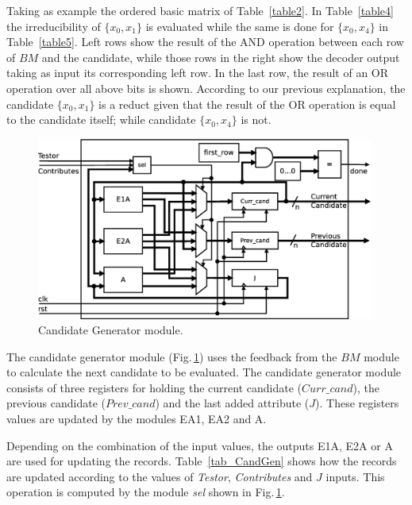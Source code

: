 \documentclass[authoryear,preprint,review,12pt]{elsarticle}
\begin{document}
Taking as example the ordered basic matrix of Table~\ref{table2}. In Table~\ref{table4} the irreducibility of  $\{x_0,x_1\}$ is evaluated while the same is done for $\{x_0,x_4\}$ in Table~\ref{table5}. Left rows show the result of the AND operation between each row of $BM$ and the candidate, while those rows in the right show the decoder output taking as input its corresponding left row. In the last row, the result of an OR operation over all above bits is shown. According to our previous explanation, the candidate $\{x_0,x_1\}$ is a reduct given that the result of the OR operation is equal to the candidate itself; while candidate $\{x_0,x_4\}$ is not.

\begin{figure}[t]
    \begin{center}
        \includegraphics[height=6cm]{CandGen.eps}
    \end{center}
\caption{Candidate Generator module.}
\label{fig:5}
\end{figure}

The candidate generator module (Fig.\,\ref{fig:5}) uses the feedback from the $BM$ module
to calculate the next candidate to be evaluated. The
candidate generator module consists of three
registers for holding the current candidate (\textit{$Curr\_cand$}), the previous candidate
(\textit{$Prev\_cand$}) and the last added attribute ($J$). These registers values are updated
by the modules EA1, EA2 and A.

Depending on the combination of the input values, the outputs E1A,
E2A or A are used for updating the records. Table~\ref{tab_CandGen} shows how the records are updated 
according to the values of \textit{Testor}, \textit{Contributes} and $J$ inputs. 
This operation is computed by the module \textit{sel} shown in Fig.\,\ref{fig:5}.
\end{document}
